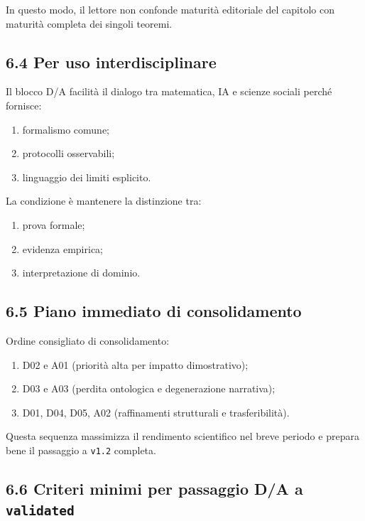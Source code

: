 In questo modo, il lettore non confonde maturità editoriale del capitolo con maturità completa dei singoli teoremi.

\subsection{6.4 Per uso interdisciplinare}

Il blocco D/A facilità il dialogo tra matematica, IA e scienze sociali perché fornisce:

\begin{enumerate}
\def\labelenumi{\arabic{enumi}.}
\tightlist
\item
  formalismo comune;
\item
  protocolli osservabili;
\item
  linguaggio dei limiti esplicito.
\end{enumerate}

La condizione è mantenere la distinzione tra:

\begin{enumerate}
\def\labelenumi{\arabic{enumi}.}
\tightlist
\item
  prova formale;
\item
  evidenza empirica;
\item
  interpretazione di dominio.
\end{enumerate}

\subsection{6.5 Piano immediato di consolidamento}

Ordine consigliato di consolidamento:

\begin{enumerate}
\def\labelenumi{\arabic{enumi}.}
\tightlist
\item
  D02 e A01 (priorità alta per impatto dimostrativo);
\item
  D03 e A03 (perdita ontologica e degenerazione narrativa);
\item
  D01, D04, D05, A02 (raffinamenti strutturali e trasferibilità).
\end{enumerate}

Questa sequenza massimizza il rendimento scientifico nel breve periodo e prepara bene il passaggio a \texttt{v1.2} completa.

\subsection{\texorpdfstring{6.6 Criteri minimi per passaggio D/A a \texttt{validated}}{6.6 Criteri minimi per passaggio D/A a validated}}

